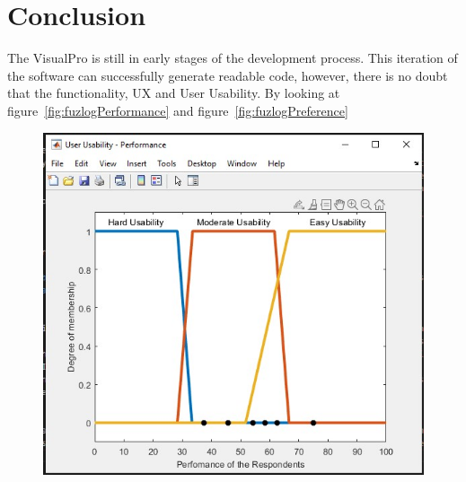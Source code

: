 \documentclass[12pt]{report} %
\begin{document}
	\chapter{Conclusion}
		The VisualPro is still in early stages of the development process. This iteration of the software can successfully generate readable code, however, there is no doubt that the functionality, UX and User Usability. By looking at figure~\ref{fig:fuzlogPerformance} and figure~\ref{fig:fuzlogPreference}

		\begin{figure}[H]
			{\includegraphics[scale=0.6]{Figures/VisualPro-Survey-FuzzyLogic/RespondentsPerformance.jpg}}
		\end{figure}
\end{document}
